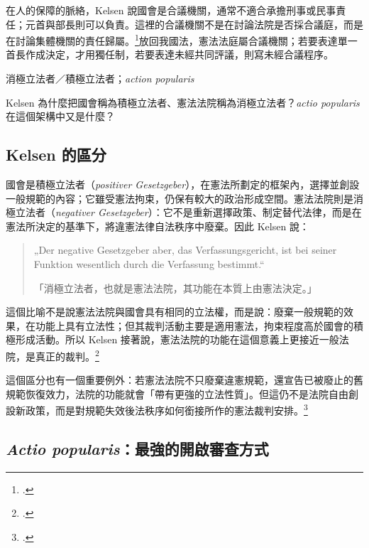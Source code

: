 在人的保障的脈絡，Kelsen 說國會是合議機關，通常不適合承擔刑事或民事責任；元首與部長則可以負責。這裡的合議機關不是在討論法院是否採合議庭，而是在討論集體機關的責任歸屬。\footcites[43--44]{kelsen2015}[51--52]{kelsen1929}放回我國法，憲法法庭屬合議機關；若要表達單一首長作成決定，才用獨任制，若要表達未經共同評議，則寫未經合議程序。


\begin{qaprompt}
消極立法者／積極立法者；\emph{action popularis}
\end{qaprompt}

\begin{qaquestion}
Kelsen 為什麼把國會稱為積極立法者、憲法法院稱為消極立法者？\emph{actio popularis} 在這個架構中又是什麼？
\end{qaquestion}

\subsection{Kelsen 的區分}

國會是積極立法者（\emph{positiver Gesetzgeber}），在憲法所劃定的框架內，選擇並創設一般規範的內容；它雖受憲法拘束，仍保有較大的政治形成空間。憲法法院則是消極立法者（\emph{negativer Gesetzgeber}）：它不是重新選擇政策、制定替代法律，而是在憲法所決定的基準下，將違憲法律自法秩序中廢棄。因此 Kelsen 說：

\begin{quote}
„Der negative Gesetzgeber aber, das Verfassungsgericht, ist bei seiner Funktion wesentlich durch die Verfassung bestimmt.``

「消極立法者，也就是憲法法院，其功能在本質上由憲法決定。」
\end{quote}

這個比喻不是說憲法法院與國會具有相同的立法權，而是說：廢棄一般規範的效果，在功能上具有立法性；但其裁判活動主要是適用憲法，拘束程度高於國會的積極形成活動。所以 Kelsen 接著說，憲法法院的功能在這個意義上更接近一般法院，是真正的裁判。\footcites[47]{kelsen2015}[56]{kelsen1929}

這個區分也有一個重要例外：若憲法法院不只廢棄違憲規範，還宣告已被廢止的舊規範恢復效力，法院的功能就會「帶有更強的立法性質」。但這仍不是法院自由創設新政策，而是對規範失效後法秩序如何銜接所作的憲法裁判安排。\footcites[63]{kelsen2015}[73]{kelsen1929}

\subsection{\texorpdfstring{\emph{Actio popularis}：最強的開啟審查方式}{Actio popularis：最強的開啟審查方式}}

